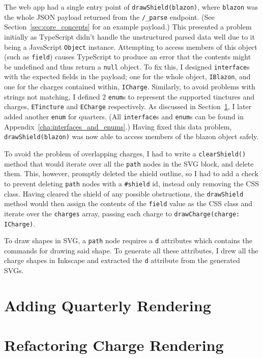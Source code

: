 \documentclass[nobib, a4paper, twoside, justified]{tufte-book}
\begin{document}
The web app had a single entry point of \texttt{drawShield(blazon)}, where \texttt{blazon} was the
whole JSON payload returned from the \texttt{/\_parse} endpoint. (See
Section~\ref{sec:core_concepts} for an example payload.) This presented a problem initially as
TypeScript didn't handle the unstructured parsed data well due to it being a JavaScript
\texttt{Object} instance. Attempting to access members of this object (such as \texttt{field})
causes TypeScript to produce an error that the contents might be undefined and thus return a
\texttt{null} object. To fix this, I designed \texttt{interface}s with the expected fields in the
payload; one for the whole object, \texttt{IBlazon}, and one for the charges contained within,
\texttt{ICharge}. Similarly, to avoid problems with strings not matching, I defined 2
\texttt{enum}s to represent the supported tinctures and charges, \texttt{ETincture} and
\texttt{ECharge} respectively. As discussed in Section~\ref{sec:adding_quarterly_rendering}, I
later added another \texttt{enum} for quarters. (All \texttt{interface}s and \texttt{enum}s can be
found in Appendix~\ref{cha:interfaces_and_enums}.) Having fixed this data problem,
\texttt{drawShield(blazon)} was now able to access members of the blazon object safely.

To avoid the problem of overlapping charges, I had to write a \texttt{clearShield()} method that
would iterate over all the \texttt{path} nodes in the SVG block, and delete them. This, however,
promptly deleted the shield outline, so I had to add a check to prevent deleting \texttt{path}
nodes with a \texttt{\#shield} id, instead only removing the CSS class. Having cleared the shield
of any possible obstructions, the \texttt{drawShield} method would then assign the contents of the
\texttt{field} value as the CSS class and iterate over the \texttt{charges} array, passing each
charge to \texttt{drawCharge(charge: ICharge)}.

To draw shapes in SVG, a \texttt{path} node requires a \texttt{d} attributes which contains the
commands for drawing said shape. To generate all these attributes, I drew all the charge shapes in
Inkscape and extracted the \texttt{d} attribute from the generated SVGs.

\section{Adding Quarterly Rendering}%
\label{sec:adding_quarterly_rendering}

\section{Refactoring Charge Rendering}%
\label{sec:refactoring_charge_rendering}
\end{document}
